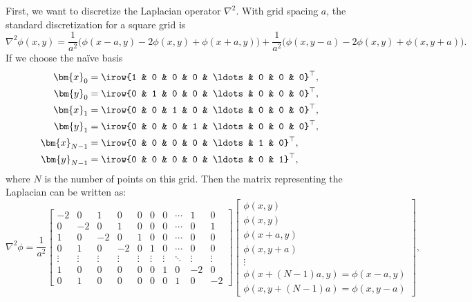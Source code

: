\Answer{}
First, we want to discretize the Laplacian operator \(\nabla^2\).
With grid spacing \(a\), the standard discretization for a square grid is
%
\begin{equation}\label{eq:del2phi}
    \nabla^2 \phi(x, y) =
    \frac{ 1 }{ a^2 } \bigl(\phi(x - a, y) - 2 \phi(x, y) + \phi(x + a, y)\bigr) +
    \frac{ 1 }{ a^2 } \bigl(\phi(x, y - a) - 2 \phi(x, y) + \phi(x, y + a)\bigr).
\end{equation}
%
If we choose the naïve basis
%
\begin{equation}
    \begin{split}
        \bm{x}_{0} &= \irow{1 & 0 & 0 & 0 & \ldots & 0 & 0 & 0}^\top, \\
        \bm{y}_{0} &= \irow{0 & 1 & 0 & 0 & \ldots & 0 & 0 & 0}^\top, \\
        \bm{x}_{1} &= \irow{0 & 0 & 1 & 0 & \ldots & 0 & 0 & 0}^\top, \\
        \bm{y}_{1} &= \irow{0 & 0 & 0 & 1 & \ldots & 0 & 0 & 0}^\top, \\
        \bm{x}_{N - 1} &= \irow{0 & 0 & 0 & 0 & \ldots & 1 & 0}^\top, \\
        \bm{y}_{N - 1} &= \irow{0 & 0 & 0 & 0 & \ldots & 0 & 1}^\top,
    \end{split}
\end{equation}
%
where \(N\) is the number of points on this grid.
Then the matrix representing the Laplacian can be written as:
%
\begin{equation}\label{eq:naive}
    \nabla^2 \phi = \frac{1}{a^2} \begin{bmatrix}
        -2     & 0      & 1      & 0      & 0      & 0      & 0      & \cdots & 1      & 0      \\
        0      & -2     & 0      & 1      & 0      & 0      & 0      & \cdots & 0      & 1      \\
        1      & 0      & -2     & 0      & 1      & 0      & 0      & \cdots & 0      & 0      \\
        0      & 1      & 0      & -2     & 0      & 1      & 0      & \cdots & 0      & 0      \\
        \vdots & \vdots & \vdots & \vdots & \vdots & \vdots & \vdots & \ddots & \vdots & \vdots \\
        1      & 0      & 0      & 0      & 0      & 0      & 1      & 0      & -2     & 0      \\
        0      & 1      & 0      & 0      & 0      & 0      & 0      & 1      & 0      & -2
    \end{bmatrix}
    \begin{bmatrix}
        \phi(x, y)                           \\
        \phi(x, y)                           \\
        \phi(x + a, y)                       \\
        \phi(x, y + a)                       \\
        \vdots                               \\
        \phi(x + (N-1)a, y) = \phi(x - a, y) \\
        \phi(x, y + (N-1)a) = \phi(x, y - a)
    \end{bmatrix},
\end{equation}
